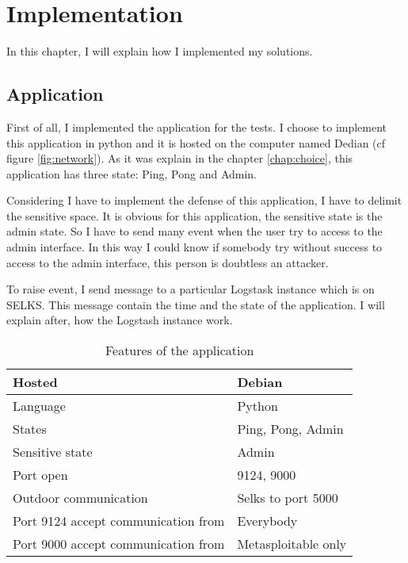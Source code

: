 
\chapter{Implementation}

In this chapter, I will explain how I implemented my solutions.

\section{Application}

First of all, I implemented the application for the tests. I choose to implement this application in python and it
is hosted on the computer named Dedian (cf figure \ref{fig:network}). As it was explain in the chapter
\ref{chap:choice}, this application has three state: Ping, Pong and Admin.

Considering I have to implement the defense of this application, I have to delimit the sensitive space. It is
obvious for this application, the sensitive state is the admin state. So I have to send many event when the user
try to access to the admin interface. In this way I could know if somebody try without success to access to the
admin interface, this person is doubtless an attacker.

To raise event, I send message to a particular Logstask instance which is on SELKS. This message contain the time
and the state of the application. I will explain after, how the Logstash instance work.

\begin{table}[h]
  \centering
  \begin{tabularx}{1.0\linewidth}{|X|X|}
    \hline
    Hosted&Debian\\
    \hline
    Language & Python \\
    \hline
    States & Ping, Pong, Admin \\
    \hline
    Sensitive state & Admin \\
    \hline
    Port open & 9124, 9000\\
    \hline
    Outdoor communication & Selks to port 5000 \\
    \hline
    Port 9124 accept communication from & Everybody \\
    \hline
    Port 9000 accept communication from & Metasploitable only\\
    \hline
  \end{tabularx}
  \caption{Features of the application}
  \label{tab:carac}
\end{table}


